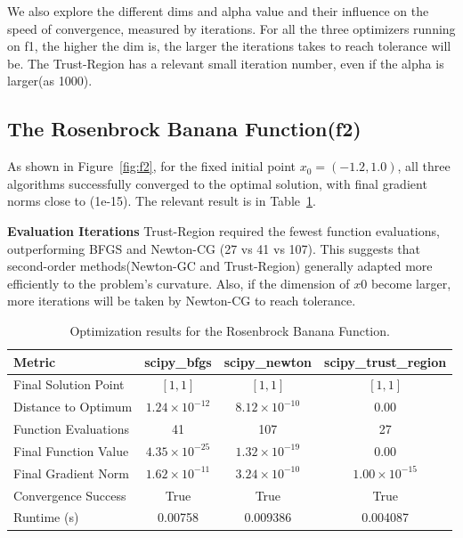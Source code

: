 \documentclass[12pt]{article}
\begin{document}
We also explore the different dims and alpha value and their influence on the speed of convergence, measured by iterations. For all the three optimizers running on f1, the higher the dim is, the larger the iterations takes to reach tolerance will be. The Trust-Region has a relevant small iteration number, even if the alpha is larger(as 1000).


\subsection{The Rosenbrock Banana Function(f2)}

As shown in Figure~\ref{fig:f2}, for the fixed initial point $x_0=(-1.2,1.0)$, all three algorithms successfully converged to the optimal solution, with final gradient norms close to (1e-15). The relevant result is in Table~\ref{tab:f2}.


\textbf{Evaluation Iterations}  
Trust-Region required the fewest function evaluations, outperforming BFGS and Newton-CG (27 vs 41 vs 107). This suggests that second-order methods(Newton-GC and Trust-Region) generally adapted more efficiently to the problem’s curvature. Also, if the dimension of $x0$ become larger, more iterations will be taken by Newton-CG to reach tolerance.


\begin{table}[h]
    \centering
\begin{tabular}{lccc}
    \toprule
    Metric & scipy\_bfgs & scipy\_newton & scipy\_trust\_region \\
    \midrule
    Final Solution Point & $[1, 1]$ & $[1, 1]$ & $[1, 1]$ \\
    Distance to Optimum & $1.24\times10^{-12}$ & $8.12\times10^{-10}$ & $0.00$ \\
    Function Evaluations & 41 & 107 & 27 \\
    Final Function Value & $4.35\times10^{-25}$ & $1.32\times10^{-19}$ & $0.00$ \\
    Final Gradient Norm & $1.62\times10^{-11}$ & $3.24\times10^{-10}$ & $1.00\times10^{-15}$ \\
    Convergence Success & True & True & True \\
    Runtime (s) & 0.00758 & 0.009386 & 0.004087 \\
    \bottomrule
\end{tabular}
    \caption{Optimization results for the Rosenbrock Banana Function.}
    \label{tab:f2}
\end{table}
\end{document}
